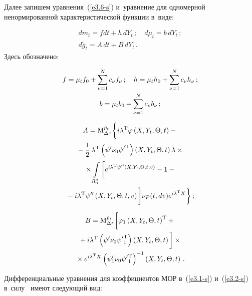 \begin{multicols}{2}
Далее запишем уравнения~(\ref{e3.6-s}) и~уравнение для одномерной ненормированной
характеристической функции в~виде:

\noindent
  \begin{gather*}
    dm_t = f dt + h\, dY_t\,;\quad d\mu_t = b\, dY_t\,; %
    \\
d\tilde g_t = A\, dt + B\,dY_t\,. %
\end{gather*}
Здесь обозначено:

\noindent
   \begin{gather*}
    f=\mu_t f_0
    +\sum\limits_{\nu=1}^N c_\nu f_\nu\,;\quad h= \mu_t h_0 +\sum\limits_{\nu=1}^N
    c_\nu h_\nu\,; \\
    b= \mu_t b_0 +\sum\limits_{\nu=1}^N c_\nu b_\nu\,;
    \end{gather*}
    
    \vspace*{-14pt}
    
    \noindent
    \begin{multline*}
    A={\rm M}_{\Delta^x}^{\tilde{p}_t}  \biggl\{
    i\lambda^{\mathrm{T}} \varphi \left(X,Y_t,\Theta,t\right) -{}\\
    {}-\displaystyle\frac{\displaystyle 1\mathstrut}{\displaystyle 2\mathstrut}\,
    \lambda^{\mathrm{T}} \left(\psi' \nu_0 {\psi'}^{\mathrm{T}}\right) 
    \left(X,Y_t,\Theta,t\right) \lambda\times{}\\
{}\times \int\limits_{R_0^q} \bigg[ e^{i\lambda^{\mathrm{T}} \psi'' 
\left(X,Y_t,\Theta,t,v\right)} -1- {}\\
{}-i\lambda^{\mathrm{T}}
    \psi'' \left(X,Y_t,\Theta,t,v\right)\bigg] \nu_P (t,dv) 
    e^{i\lambda^{\mathrm{T}} X}\biggr\}\,;
    \end{multline*}
    
 \vspace*{-14pt}
    
    \noindent
    \begin{multline*}
    B={\rm M}_{\Delta^x}^{\tilde{p}_t}  \bigg[ 
    \varphi_1 \left(X,Y_t,\Theta,t\right)^{\mathrm{T}} + {}\\
    {}+
    i\lambda^{\mathrm{T}} \left(\psi'\nu_0 {\psi'}_1^{\mathrm{T}}\right) 
    \left(X,Y_t,\Theta,t\right)\bigg]\times{}\\
{}\times e^{i\lambda^{\mathrm{T}} X} \left(\psi_1^\prime \nu_0 {\psi'}_1^{\mathrm{T}}\right)^{-1} 
\left(X,Y_t,\Theta,t\right)\,.
    \end{multline*}

Дифференциальные уравнения для коэффициентов МОР в~(\ref{e3.1-s}) и~(\ref{e3.2-s}) 
в~силу~\cite{5-s} имеют следующий вид:


\end{multicols}
